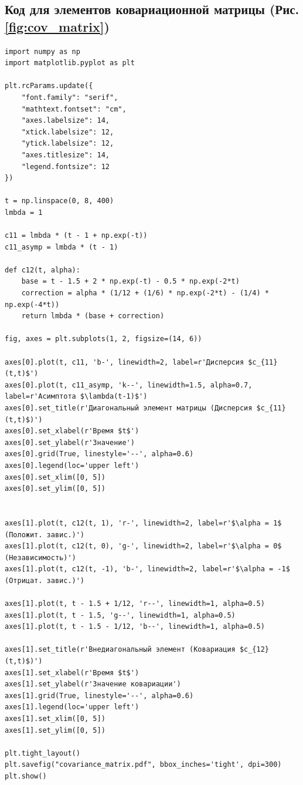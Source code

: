 \documentclass[12pt]{article}
\theoremstyle{plain}
\theoremstyle{definition}
\theoremstyle{remark}
\begin{document}
\subsection*{Код для элементов ковариационной матрицы (Рис. \ref{fig:cov_matrix})}
\begin{lstlisting}
import numpy as np
import matplotlib.pyplot as plt

plt.rcParams.update({
    "font.family": "serif",
    "mathtext.fontset": "cm",
    "axes.labelsize": 14,
    "xtick.labelsize": 12,
    "ytick.labelsize": 12,
    "axes.titlesize": 14,
    "legend.fontsize": 12
})

t = np.linspace(0, 8, 400)
lmbda = 1  

c11 = lmbda * (t - 1 + np.exp(-t))
c11_asymp = lmbda * (t - 1)  

def c12(t, alpha):
    base = t - 1.5 + 2 * np.exp(-t) - 0.5 * np.exp(-2*t)
    correction = alpha * (1/12 + (1/6) * np.exp(-2*t) - (1/4) * np.exp(-4*t))
    return lmbda * (base + correction)

fig, axes = plt.subplots(1, 2, figsize=(14, 6))

axes[0].plot(t, c11, 'b-', linewidth=2, label=r'Дисперсия $c_{11}(t,t)$')
axes[0].plot(t, c11_asymp, 'k--', linewidth=1.5, alpha=0.7, label=r'Асимптота $\lambda(t-1)$')
axes[0].set_title(r'Диагональный элемент матрицы (Дисперсия $c_{11}(t,t)$)')
axes[0].set_xlabel(r'Время $t$')
axes[0].set_ylabel(r'Значение')
axes[0].grid(True, linestyle='--', alpha=0.6)
axes[0].legend(loc='upper left')
axes[0].set_xlim([0, 5])
axes[0].set_ylim([0, 5])


axes[1].plot(t, c12(t, 1), 'r-', linewidth=2, label=r'$\alpha = 1$ (Положит. завис.)')
axes[1].plot(t, c12(t, 0), 'g-', linewidth=2, label=r'$\alpha = 0$ (Независимость)')
axes[1].plot(t, c12(t, -1), 'b-', linewidth=2, label=r'$\alpha = -1$ (Отрицат. завис.)')

axes[1].plot(t, t - 1.5 + 1/12, 'r--', linewidth=1, alpha=0.5)
axes[1].plot(t, t - 1.5, 'g--', linewidth=1, alpha=0.5)
axes[1].plot(t, t - 1.5 - 1/12, 'b--', linewidth=1, alpha=0.5)

axes[1].set_title(r'Внедиагональный элемент (Ковариация $c_{12}(t,t)$)')
axes[1].set_xlabel(r'Время $t$')
axes[1].set_ylabel(r'Значение ковариации')
axes[1].grid(True, linestyle='--', alpha=0.6)
axes[1].legend(loc='upper left')
axes[1].set_xlim([0, 5])
axes[1].set_ylim([0, 5])

plt.tight_layout()
plt.savefig("covariance_matrix.pdf", bbox_inches='tight', dpi=300)
plt.show()
\end{lstlisting}
\end{document}

